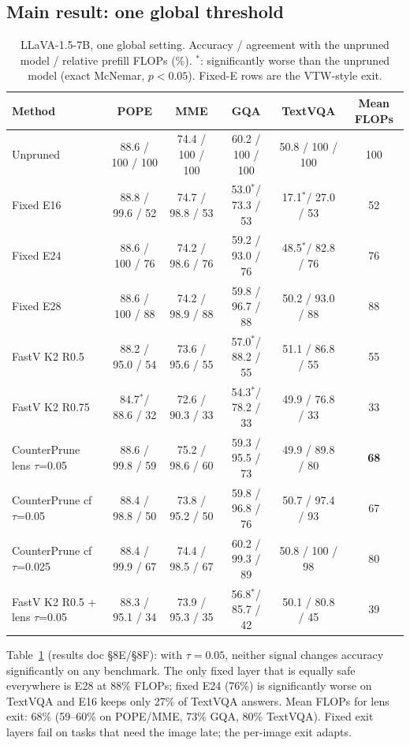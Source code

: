 \documentclass[10pt]{article}
\newcommand{\method}{CounterPrune}
\newcommand{\sig}{$^{*}$}
\begin{document}
\subsection{Main result: one global threshold}
\begin{table}[t]
\centering\small
\caption{LLaVA-1.5-7B, one global setting. Accuracy / agreement with the unpruned model / relative prefill FLOPs (\%).
\sig: significantly worse than the unpruned model (exact McNemar, $p<0.05$). Fixed-E rows are the VTW-style exit.}
\label{tab:main}
\begin{tabular}{lccccc}
\toprule
Method & POPE & MME & GQA & TextVQA & Mean FLOPs \\
\midrule
Unpruned & 88.6 / 100 / 100 & 74.4 / 100 / 100 & 60.2 / 100 / 100 & 50.8 / 100 / 100 & 100 \\
Fixed E16 & 88.8 / 99.6 / 52 & 74.7 / 98.8 / 53 & 53.0\sig / 73.3 / 53 & 17.1\sig / 27.0 / 53 & 52 \\
Fixed E24 & 88.6 / 100 / 76 & 74.2 / 98.6 / 76 & 59.2 / 93.0 / 76 & 48.5\sig / 82.8 / 76 & 76 \\
Fixed E28 & 88.6 / 100 / 88 & 74.2 / 98.9 / 88 & 59.8 / 96.7 / 88 & 50.2 / 93.0 / 88 & 88 \\
FastV K2 R0.5 & 88.2 / 95.0 / 54 & 73.6 / 95.6 / 55 & 57.0\sig / 88.2 / 55 & 51.1 / 86.8 / 55 & 55 \\
FastV K2 R0.75 & 84.7\sig / 88.6 / 32 & 72.6 / 90.3 / 33 & 54.3\sig / 78.2 / 33 & 49.9 / 76.8 / 33 & 33 \\
\midrule
\method{} lens $\tau$=0.05 & 88.6 / 99.8 / 59 & 75.2 / 98.6 / 60 & 59.3 / 95.5 / 73 & 49.9 / 89.8 / 80 & \textbf{68} \\
\method{} cf $\tau$=0.05 & 88.4 / 98.8 / 50 & 73.8 / 95.2 / 50 & 59.8 / 96.8 / 76 & 50.7 / 97.4 / 93 & 67 \\
\method{} cf $\tau$=0.025 & 88.4 / 99.9 / 67 & 74.4 / 98.5 / 67 & 60.2 / 99.3 / 89 & 50.8 / 100 / 98 & 80 \\
FastV K2 R0.5 + lens $\tau$=0.05 & 88.3 / 95.1 / 34 & 73.9 / 95.3 / 35 & 56.8\sig / 85.7 / 42 & 50.1 / 80.8 / 45 & 39 \\
\bottomrule
\end{tabular}
\end{table}
Table~\ref{tab:main} (results doc \S8E/\S8F): with $\tau=0.05$, neither signal changes accuracy significantly on any
benchmark. The only fixed layer that is equally safe everywhere is E28 at 88\% FLOPs; fixed E24 (76\%) is
significantly worse on TextVQA and E16 keeps only 27\% of TextVQA answers. Mean FLOPs for lens exit: 68\% (59--60\% on
POPE/MME, 73\% GQA, 80\% TextVQA). Fixed exit layers fail on tasks that need the image late; the per-image exit adapts.
\end{document}
